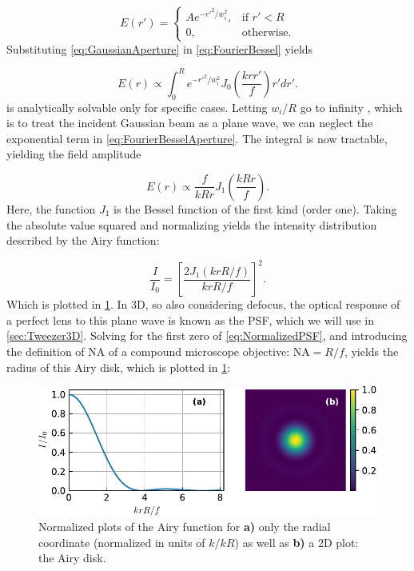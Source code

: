 \begin{equation}\label{eq:GaussianAperture}
    E(r')=
    \begin{cases}
        A e^{- r'^2/w_i^2},& \text{if } r' < R\\
        0,               & \text{otherwise}.
    \end{cases}
\end{equation}
Substituting \cref{eq:GaussianAperture} in \cref{eq:FourierBessel} yields

\begin{equation}\label{eq:FourierBesselAperture}
    E(r) \propto \int_0^R e^{-r'^2/w_i^2} J_0\left(\frac{k r r'}{f}\right)r'dr'.
\end{equation}
 is analytically solvable only for specific cases.
Letting $w_i/R$ go to infinity \cite{Madjarov2020}, which is to treat the incident Gaussian beam as a plane wave, we can neglect the exponential term in \cref{eq:FourierBesselAperture}. 
The integral is now tractable, yielding the field amplitude

\begin{equation}\label{eq:AiryField}
    E(r) \propto \frac{f}{kRr} J_1\left(\frac{k R r}{f}\right).
\end{equation}
Here, the function $J_1$ is the Bessel function of the first kind (order one).
Taking the absolute value squared and normalizing yields the intensity distribution described by the Airy function:

\begin{equation}\label{eq:NormalizedPSF}
    \frac{I}{I_0} = \left[
    \frac{2J_1(k r R/f)}{k r R/f}
    \right]^2.
\end{equation}
Which is plotted in \cref{fig:AiryPlots}.
In 3D, so also considering defocus, the optical response of a perfect lens to this plane wave is known as the \ac{PSF}, which we will use in \cref{sec:Tweezer3D}.
Solving for the first zero of \cref{eq:NormalizedPSF}, and introducing the definition of \ac{NA} of a compound microscope objective: $\text{NA} = R/f$, yields the radius of this Airy disk, which is plotted in \cref{fig:AiryPlots}:

\begin{figure}
    \centering
    \includegraphics[width = 0.9\linewidth]{figures/AiryDisk.pdf}
    \caption{Normalized plots of the Airy function for \textsf{\textbf{a)}} only the radial coordinate (normalized in units of $k/kR$) as well as \textsf{\textbf{b)}} a 2D plot: the Airy disk.}
    \label{fig:AiryPlots}
\end{figure}


